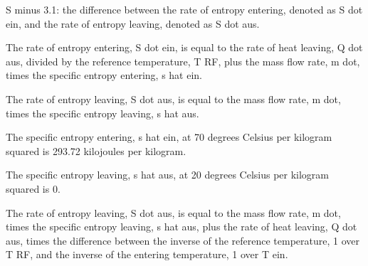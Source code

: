 S minus 3.1: the difference between the rate of entropy entering, denoted as S dot ein, and the rate of entropy leaving, denoted as S dot aus.

The rate of entropy entering, S dot ein, is equal to the rate of heat leaving, Q dot aus, divided by the reference temperature, T RF, plus the mass flow rate, m dot, times the specific entropy entering, s hat ein.

The rate of entropy leaving, S dot aus, is equal to the mass flow rate, m dot, times the specific entropy leaving, s hat aus.

The specific entropy entering, s hat ein, at 70 degrees Celsius per kilogram squared is 293.72 kilojoules per kilogram.

The specific entropy leaving, s hat aus, at 20 degrees Celsius per kilogram squared is 0.

The rate of entropy leaving, S dot aus, is equal to the mass flow rate, m dot, times the specific entropy leaving, s hat aus, plus the rate of heat leaving, Q dot aus, times the difference between the inverse of the reference temperature, 1 over T RF, and the inverse of the entering temperature, 1 over T ein.